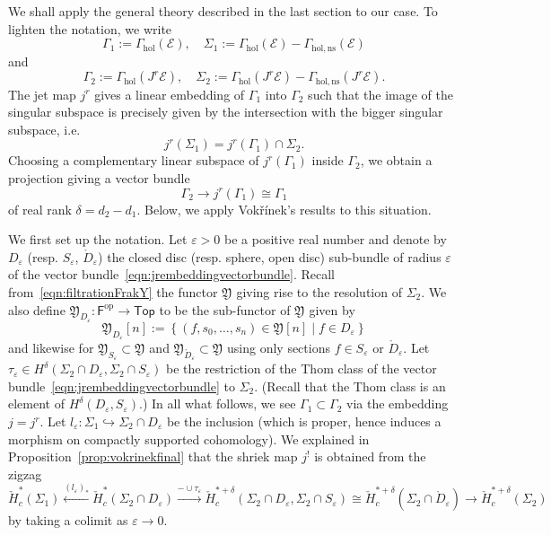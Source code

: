 \documentclass[a4paper]{amsart}
\newcommand{\cE}{\mathcal E}
\newcommand{\fY}{\mathfrak Y}
\newcommand{\lra}{\longrightarrow}
\newcommand{\op}{\text{op}}
\theoremstyle{plain}
\theoremstyle{definition}
\newcommand{\catTop}{\mathsf{Top}}
\newcommand{\catF}{\mathsf{F}}
\newcommand{\CCH}{\check{H}_{c}}
\newcommand{\Gammahol}{\Gamma_{\mathrm{hol}}}
\renewcommand{\epsilon}{\varepsilon}
\begin{document}
We shall apply the general theory described in the last section to our case. To lighten the notation, we write
\[
    \Gamma_1 := \Gammahol(\cE), \quad \Sigma_1 := \Gammahol(\cE) - \Gamma_{\mathrm{hol,ns}}(\cE)
\]
and
\[
    \Gamma_2 := \Gammahol(J^r\cE), \quad \Sigma_2 := \Gammahol(J^r\cE) - \Gamma_{\mathrm{hol,ns}}(J^r\cE).
\]
The jet map $j^r$ gives a linear embedding of $\Gamma_1$ into $\Gamma_2$ such that the image of the singular subspace is precisely given by the intersection with the bigger singular subspace, i.e.
\[
    j^r(\Sigma_1) = j^r(\Gamma_1) \cap \Sigma_2.
\]
Choosing a complementary linear subspace of $j^r(\Gamma_1)$ inside $\Gamma_2$, we obtain a projection giving a vector bundle
\begin{equation}\label{eqn:jrembeddingvectorbundle}
    \Gamma_2 \lra j^r(\Gamma_1) \cong \Gamma_1
\end{equation}
of real rank $\delta = d_2 - d_1$. Below, we apply Vok\v{r}\'{i}nek's results to this situation.

\bigskip 

We first set up the notation. Let $\epsilon > 0$ be a positive real number and denote by $D_\epsilon$ (resp. $S_\epsilon$, $\mathring{D}_\varepsilon$) the closed disc (resp. sphere, open disc) sub-bundle of radius $\epsilon$ of the vector bundle~\eqref{eqn:jrembeddingvectorbundle}. Recall from~\eqref{eqn:filtrationFrakY} the functor $\fY$ giving rise to the resolution of $\Sigma_2$. We also define $\fY_{D_\epsilon} \colon \catF^\op \to \catTop$ to be the sub-functor of $\fY$ given by
\[
    \fY_{D_\epsilon}[n] := \left\{ (f,s_0,\ldots,s_n) \in \fY[n] \mid f \in D_\epsilon \right\}
\]
and likewise for $\fY_{S_\epsilon} \subset \fY$ and $\fY_{\mathring{D}_\varepsilon} \subset \fY$ using only sections $f \in S_\epsilon$ or $\mathring{D}_\varepsilon$. Let $\tau_\varepsilon \in H^\delta(\Sigma_2 \cap D_\varepsilon, \Sigma_2 \cap S_\varepsilon)$ be the restriction of the Thom class of the vector bundle~\eqref{eqn:jrembeddingvectorbundle} to $\Sigma_2$. (Recall that the Thom class is an element of $H^\delta(D_\varepsilon, S_\varepsilon)$.) In all what follows, we see $\Gamma_1 \subset \Gamma_2$ via the embedding $j = j^r$. Let $l_\varepsilon \colon \Sigma_1 \hookrightarrow \Sigma_2 \cap D_\varepsilon$ be the inclusion (which is proper, hence induces a morphism on compactly supported cohomology). We explained in Proposition~\ref{prop:vokrinekfinal} that the shriek map $j^!$ is obtained from the zigzag
\[
    \CCH^*(\Sigma_1) \overset{(l_\varepsilon)_*}{\leftarrow} \CCH^*(\Sigma_2 \cap D_\varepsilon) \overset{-\cup \tau_\varepsilon}{\to} \CCH^{*+\delta}(\Sigma_2 \cap D_\varepsilon, \Sigma_2 \cap S_\varepsilon) \cong \CCH^{*+\delta}(\Sigma_2 \cap \mathring{D}_\varepsilon) \to \CCH^{*+\delta}(\Sigma_2)
\]
by taking a colimit as $\varepsilon \to 0$. 
\end{document}
